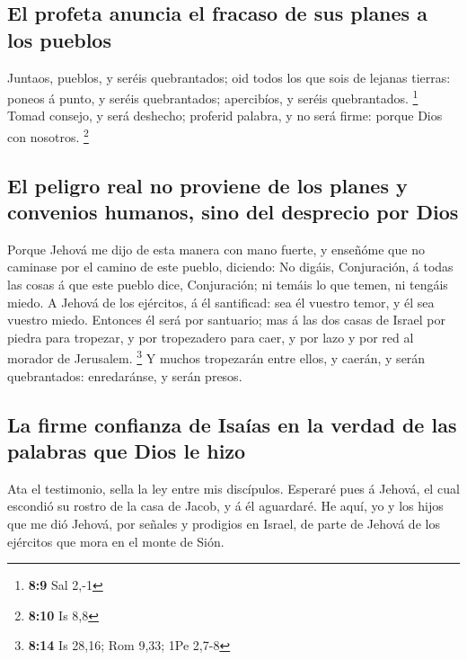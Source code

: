 \hypertarget{el-profeta-anuncia-el-fracaso-de-sus-planes-a-los-pueblos}{%
\subsection{El profeta anuncia el fracaso de sus planes a los
pueblos}\label{el-profeta-anuncia-el-fracaso-de-sus-planes-a-los-pueblos}}

 Juntaos, pueblos, y seréis quebrantados; oid todos los
que sois de lejanas tierras: poneos á punto, y seréis quebrantados;
apercibíos, y seréis quebrantados. \footnote{\textbf{8:9} Sal 2,-1}
 Tomad consejo, y será deshecho; proferid palabra, y no
será firme: porque Dios con nosotros. \footnote{\textbf{8:10} Is 8,8}

\hypertarget{el-peligro-real-no-proviene-de-los-planes-y-convenios-humanos-sino-del-desprecio-por-dios}{%
\subsection{El peligro real no proviene de los planes y convenios
humanos, sino del desprecio por
Dios}\label{el-peligro-real-no-proviene-de-los-planes-y-convenios-humanos-sino-del-desprecio-por-dios}}

 Porque Jehová me dijo de esta manera con mano fuerte, y
enseñóme que no caminase por el camino de este pueblo, diciendo:
 No digáis, Conjuración, á todas las cosas á que este
pueblo dice, Conjuración; ni temáis lo que temen, ni tengáis miedo.
 A Jehová de los ejércitos, á él santificad: sea él
vuestro temor, y él sea vuestro miedo.  Entonces él será
por santuario; mas á las dos casas de Israel por piedra para tropezar, y
por tropezadero para caer, y por lazo y por red al morador de Jerusalem.
\footnote{\textbf{8:14} Is 28,16; Rom 9,33; 1Pe 2,7-8}  Y
muchos tropezarán entre ellos, y caerán, y serán quebrantados:
enredaránse, y serán presos.

\hypertarget{la-firme-confianza-de-isauxedas-en-la-verdad-de-las-palabras-que-dios-le-hizo}{%
\subsection{La firme confianza de Isaías en la verdad de las palabras
que Dios le
hizo}\label{la-firme-confianza-de-isauxedas-en-la-verdad-de-las-palabras-que-dios-le-hizo}}

 Ata el testimonio, sella la ley entre mis discípulos.
 Esperaré pues á Jehová, el cual escondió su rostro de la
casa de Jacob, y á él aguardaré.  He aquí, yo y los hijos
que me dió Jehová, por señales y prodigios en Israel, de parte de Jehová
de los ejércitos que mora en el monte de Sión.

